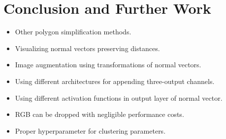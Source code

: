 \chapter*{Conclusion and Further Work}

\begin{itemize}
  \item Other polygon simplification methods.
  \item Visualizing normal vectors preserving distances.
  \item Image augmentation using transformations of normal vectors.
  \item Using different architectures for appending three-output channels.
  \item Using different activation functions in output layer of normal vector.
  \item RGB can be dropped with negligible performance costs.
  \item Proper hyperparameter for clustering parameters.
\end{itemize}
